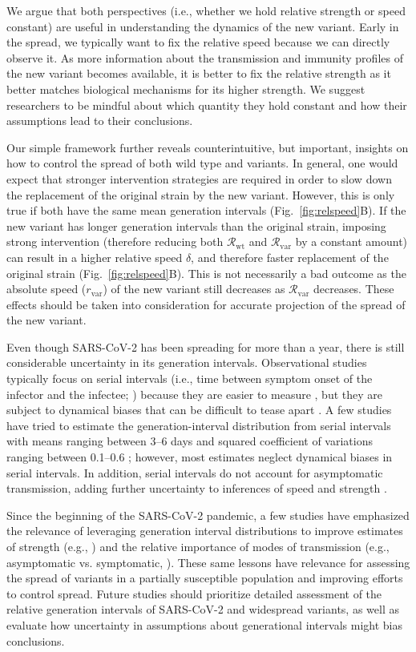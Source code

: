 \documentclass[12pt]{article}
\newcommand{\fref}[1]{Fig.~\ref{fig:#1}}
\newcommand{\vvvar}{\mathrm{var}}
\newcommand{\wwwt}{\mathrm{wt}}
\newcommand{\rx}[1]{\ensuremath{{r}_{#1}}\xspace}
\newcommand{\rv}{\rx{\vvvar}}
\newcommand{\Rx}[1]{\ensuremath{{\mathcal R}_{#1}}\xspace}
\newcommand{\Rw}{\Rx{\wwwt}}
\newcommand{\Rv}{\Rx{\vvvar}}
\begin{document}
We argue that both perspectives (i.e., whether we hold relative strength or speed constant) are useful in understanding the dynamics of the new variant.
Early in the spread, we typically want to fix the relative speed because we can directly observe it.
As more information about the transmission and immunity profiles of the new variant becomes available, it is better to fix the relative strength as it better matches biological mechanisms for its higher strength.
We suggest researchers to be mindful about which quantity they hold constant and how their assumptions lead to their conclusions.

Our simple framework further reveals counterintuitive, but important, insights on how to control the spread of both wild type and variants.
In general, one would expect that stronger intervention strategies are required in order to slow down the replacement of the original strain by the new variant.
However, this is only true if both have the same mean generation intervals (\fref{relspeed}B).
If the new variant has longer generation intervals than the original strain, imposing strong intervention (therefore reducing both $\Rw$ and $\Rv$ by a constant amount) can result in a higher relative speed $\delta$, and therefore faster replacement of the original strain (\fref{relspeed}B).
This is not necessarily a bad outcome as the absolute speed ($\rv$) of the new variant still decreases as $\Rv$ decreases.
These effects should be taken into consideration for accurate projection of the spread of the new variant.

Even though SARS-CoV-2 has been spreading for more than a year, there is still considerable uncertainty in its generation intervals.
Observational studies typically focus on serial intervals (i.e., time between symptom onset of the infector and the infectee; \cite{svensson2007note}) because they are easier to measure \citep{griffin2020rapid}, but they are subject to dynamical biases that can be difficult to tease apart \citep{park2021forward}.
A few studies have tried to estimate the generation-interval distribution from serial intervals with means ranging between 3--6 days and squared coefficient of variations ranging between 0.1--0.6 \citep{ferretti2020quantifying,Ferretti2020timing,ganyani2020estimating,knight2020estimating}; 
however, most estimates neglect dynamical biases in serial intervals.
In addition, serial intervals do not account for asymptomatic transmission, adding further uncertainty to inferences of speed and strength \citep{park2020time}.

Since the beginning of the SARS-CoV-2 pandemic, a few studies have emphasized  the relevance of leveraging generation interval distributions to improve estimates of strength (e.g., \cite{doi:10.1098/rsif.2020.0144}) and the relative importance of modes of transmission (e.g., asymptomatic vs. symptomatic, \cite{park2020time}).
These same lessons have relevance for assessing the spread of variants in a partially susceptible population and improving efforts to control spread.
Future studies should prioritize detailed assessment of the relative generation intervals of SARS-CoV-2 and widespread variants, as well as evaluate how uncertainty in assumptions about generational intervals might bias conclusions.


\end{document}

